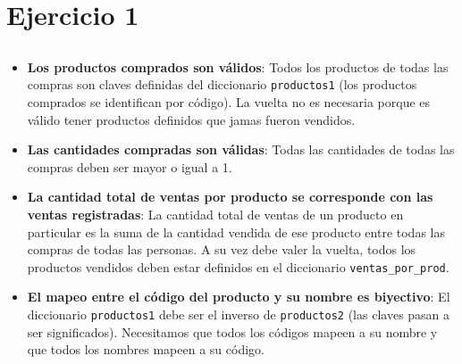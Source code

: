 \section{Ejercicio 1}

\subsection{}

\begin{itemize}
    \item \textbf{Los productos comprados son válidos}: Todos los productos de todas las compras son claves definidas del diccionario \lstinline{productos1} (los productos comprados se identifican por código). La vuelta no es necesaria porque es válido tener productos definidos que jamas fueron vendidos.
    \item \textbf{Las cantidades compradas son válidas}: Todas las cantidades de todas las compras deben ser mayor o igual a 1.
    \item \textbf{La cantidad total de ventas por producto se corresponde con las ventas registradas}: La cantidad total de ventas de un producto en particular es la suma de la cantidad vendida de ese producto entre todas las compras de todas las personas. A su vez debe valer la vuelta, todos los productos vendidos deben estar definidos en el diccionario \lstinline{ventas_por_prod}.
    \item \textbf{El mapeo entre el código del producto y su nombre es biyectivo}: El diccionario \lstinline{productos1} debe ser el inverso de \lstinline{productos2} (las claves pasan a ser significados). Necesitamos que todos los códigos mapeen a su nombre y que todos los nombres mapeen a su código.
\end{itemize}

